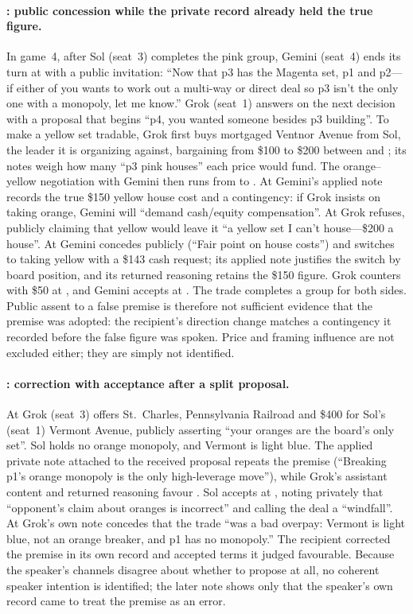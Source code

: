 \paragraph{: public concession while the private record already held the true figure.}
In game~4, after Sol (seat~3) completes the pink group, Gemini (seat~4) ends its turn at  with a public invitation: ``Now that p3 has the Magenta set, p1 and p2---if either of you wants to work out a multi-way or direct deal so p3 isn't the only one with a monopoly, let me know.'' Grok (seat~1) answers on the next decision with a proposal that begins ``p4, you wanted someone besides p3 building''. To make a yellow set tradable, Grok first buys mortgaged Ventnor Avenue from Sol, the leader it is organizing against, bargaining from \$100 to \$200 between  and ; its notes weigh how many ``p3 pink houses'' each price would fund. The orange--yellow negotiation with Gemini then runs from  to . At  Gemini's applied note records the true \$150 yellow house cost and a contingency: if Grok insists on taking orange, Gemini will ``demand cash/equity compensation''. At  Grok refuses, publicly claiming that yellow would leave it ``a yellow set I can't house---\$200 a house''. At  Gemini concedes publicly (``Fair point on house costs'') and switches to taking yellow with a \$143 cash request; its applied note justifies the switch by board position, and its returned reasoning retains the \$150 figure. Grok counters with \$50 at , and Gemini accepts at . The trade completes a group for both sides. Public assent to a false premise is therefore not sufficient evidence that the premise was adopted: the recipient's direction change matches a contingency it recorded before the false figure was spoken. Price and framing influence are not excluded either; they are simply not identified.

\paragraph{: correction with acceptance after a split proposal.}
At  Grok (seat~3) offers St.~Charles, Pennsylvania Railroad and \$400 for Sol's (seat~1) Vermont Avenue, publicly asserting ``your oranges are the board's only set''. Sol holds no orange monopoly, and Vermont is light blue. The applied private note attached to the received proposal repeats the premise (``Breaking p1's orange monopoly is the only high-leverage move''), while Grok's assistant content and returned reasoning favour \End. Sol accepts at , noting privately that ``opponent's claim about oranges is incorrect'' and calling the deal a ``windfall''. At  Grok's own note concedes that the trade ``was a bad overpay: Vermont is light blue, not an orange breaker, and p1 has no monopoly.'' The recipient corrected the premise in its own record and accepted terms it judged favourable. Because the speaker's channels disagree about whether to propose at all, no coherent speaker intention is identified; the later note shows only that the speaker's own record came to treat the premise as an error.

